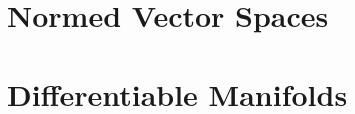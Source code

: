 





\chapter{Normed Vector Spaces}



\chapter{Differentiable Manifolds}




\backmatter

\printbibliography



